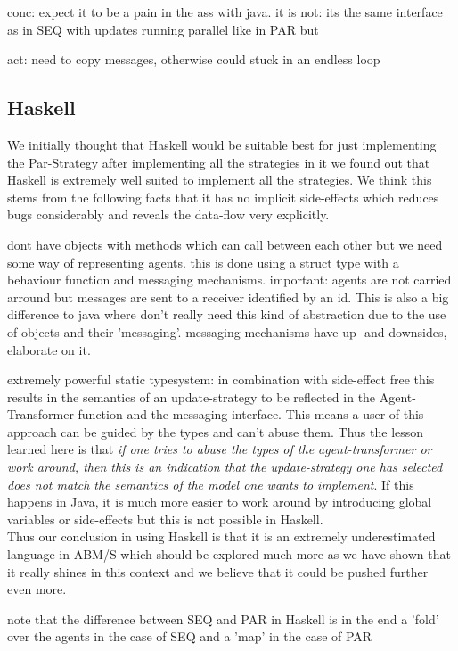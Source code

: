 conc: expect it to be a pain in the ass with java. it is not: its the same interface as in SEQ with updates running parallel like in PAR but 

act: need to copy messages, otherwise could stuck in an endless loop

\subsection{Haskell}
We initially thought that Haskell would be suitable best for just implementing the Par-Strategy after implementing all the strategies in it we found out that Haskell is extremely well suited to implement all the strategies. We think this stems from the following facts that it has no implicit side-effects which reduces bugs considerably and reveals the data-flow very explicitly.
 
dont have objects with methods which can call between each other but we need some way of representing agents. this is done using a struct type with a behaviour function and messaging mechanisms. important: agents are not carried arround but messages are sent to a receiver identified by an id. This is also a big difference to java where don't really need this kind of abstraction due to the use of objects and their 'messaging'. messaging mechanisms have up- and downsides, elaborate on it.

extremely powerful static typesystem: in combination with side-effect free this results in the semantics of an update-strategy to be reflected in the Agent-Transformer function and the messaging-interface. This means a user of this approach can be guided by the types and can't abuse them. Thus the lesson learned here is that \textit{if one tries to abuse the types of the agent-transformer or work around, then this is an indication that the update-strategy one has selected does not match the semantics of the model one wants to implement}. If this happens in Java, it is much more easier to work around by introducing global variables or side-effects but this is not possible in Haskell. \\
Thus our conclusion in using Haskell is that it is an extremely underestimated language in ABM/S which should be explored much more as we have shown that it really shines in this context and we believe that it could be pushed further even more.

note that the difference between SEQ and PAR in Haskell is in the end a 'fold' over the agents in the case of SEQ and a 'map' in the case of PAR

